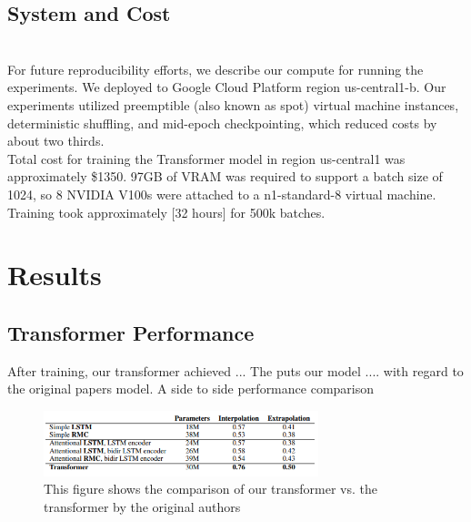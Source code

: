 \subsection{System and Cost} \\

For future reproducibility efforts, we describe our compute for running the experiments. We deployed to Google Cloud Platform region us-central1-b. Our experiments utilized preemptible (also known as spot) virtual machine instances, deterministic shuffling, and mid-epoch checkpointing, which reduced costs by about two thirds. \\

Total cost for training the Transformer model in region us-central1 was approximately \$1350. 97GB of VRAM was required to support a batch size of 1024, so 8 NVIDIA V100s were attached to a n1-standard-8 virtual machine. Training took approximately [32 hours] for 500k batches. \\



\section{Results}

\subsection{Transformer Performance}


After training, our transformer achieved ... The puts our model .... with regard to the original papers model. A side to side performance comparison 


\begin{figure}[h]
\includegraphics[width=8cm]{images/test_image.PNG}
\centering
\caption{This figure shows the comparison of our transformer vs. the transformer by the original authors}

\end{figure}

